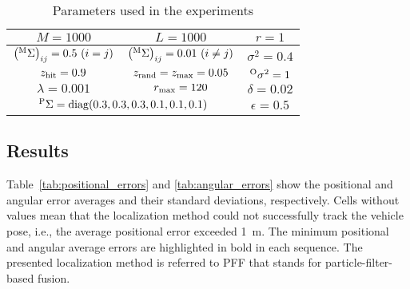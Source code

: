\documentclass[letterpaper, 10 pt, conference]{ieeeconf}  %
\begin{document}
\begin{table}[!t]
\begin{center}
\caption{Parameters used in the experiments}
\begin{tabular}{|cc|c|}
\hline
\multicolumn{1}{|c|}{$M = 1000$}                                           & $L = 1000$                                               & $r = 1$                    \\ \hline
\multicolumn{1}{|c|}{$\left( {}^{\rm M}\Sigma \right)_{ij} = 0.5~(i = j)$} & $\left( {}^{\rm M}\Sigma \right)_{ij} = 0.01~(i \neq j)$ & $\sigma^{2} = 0.4$         \\ \hline
\multicolumn{1}{|c|}{$z_{{\rm hit}} = 0.9$}                                & {$z_{{\rm rand}} = z_{{\rm max}} = 0.05$}                & ${}^{\rm O}\sigma^{2} = 1$ \\ \hline
\multicolumn{1}{|c|}{$\lambda = 0.001$}                                    & $r_{{\rm max}} = 120$                                    & {$ \delta = 0.02$}         \\ \hline
\multicolumn{2}{|c|}{${}^{\rm P}\Sigma = {\rm diag}(0.3, 0.3, 0.3, 0.1, 0.1, 0.1)$}                                                   & $\epsilon = 0.5$           \\ \hline
\end{tabular}
\label{tab:parameters}
\end{center}
\end{table}



\subsection{Results}
\label{subsec:results}

Table~\ref{tab:positional_errors} and \ref{tab:angular_errors} show the positional and angular error averages and their standard deviations, respectively.
Cells without values mean that the localization method could not successfully track the vehicle pose, i.e., the average positional error exceeded 1~m.
The minimum positional and angular average errors are highlighted in bold in each sequence.
The presented localization method is referred to PFF that stands for particle-filter-based fusion.
\end{document}
